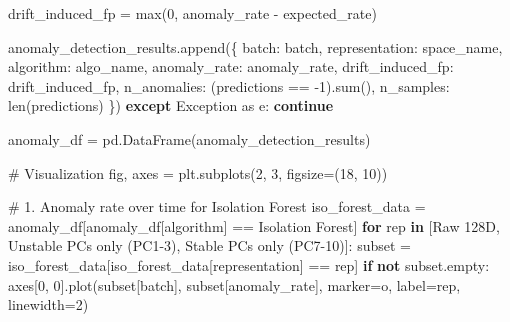 \documentclass[
  letterpaper,
  DIV=11,
  numbers=noendperiod]{scrartcl}
\newenvironment{Shaded}{\begin{snugshade}}{\end{snugshade}}
\newcommand{\BuiltInTok}[1]{\textcolor[rgb]{0.00,0.23,0.31}{#1}}
\newcommand{\CommentTok}[1]{\textcolor[rgb]{0.37,0.37,0.37}{#1}}
\newcommand{\ControlFlowTok}[1]{\textcolor[rgb]{0.00,0.23,0.31}{\textbf{#1}}}
\newcommand{\DecValTok}[1]{\textcolor[rgb]{0.68,0.00,0.00}{#1}}
\newcommand{\ImportTok}[1]{\textcolor[rgb]{0.00,0.46,0.62}{#1}}
\newcommand{\KeywordTok}[1]{\textcolor[rgb]{0.00,0.23,0.31}{\textbf{#1}}}
\newcommand{\NormalTok}[1]{\textcolor[rgb]{0.00,0.23,0.31}{#1}}
\newcommand{\OperatorTok}[1]{\textcolor[rgb]{0.37,0.37,0.37}{#1}}
\newcommand{\PreprocessorTok}[1]{\textcolor[rgb]{0.68,0.00,0.00}{#1}}
\newcommand{\StringTok}[1]{\textcolor[rgb]{0.13,0.47,0.30}{#1}}
\renewenvironment{Shaded}{%
  \begin{tcolorbox}[%
    enhanced,%
    colback=codebg,%
    colframe=codebg,%
    borderline west={3pt}{0pt}{sectionblue},%
    fontupper=\small\ttfamily,%
    boxrule=0pt,%
    arc=0pt,%
    boxsep=5pt,%
    left=2mm,%
    right=2mm,%
    top=2mm,%
    bottom=2mm%
  ]%
}{%
  \end{tcolorbox}%
}
\begin{document}
\begin{Shaded}
\begin{Highlighting}[]
\NormalTok{                drift\_induced\_fp }\OperatorTok{=} \BuiltInTok{max}\NormalTok{(}\DecValTok{0}\NormalTok{, anomaly\_rate }\OperatorTok{{-}}\NormalTok{ expected\_rate)}
                
\NormalTok{                anomaly\_detection\_results.append(\{}
                    \StringTok{\textquotesingle{}batch\textquotesingle{}}\NormalTok{: batch,}
                    \StringTok{\textquotesingle{}representation\textquotesingle{}}\NormalTok{: space\_name,}
                    \StringTok{\textquotesingle{}algorithm\textquotesingle{}}\NormalTok{: algo\_name,}
                    \StringTok{\textquotesingle{}anomaly\_rate\textquotesingle{}}\NormalTok{: anomaly\_rate,}
                    \StringTok{\textquotesingle{}drift\_induced\_fp\textquotesingle{}}\NormalTok{: drift\_induced\_fp,}
                    \StringTok{\textquotesingle{}n\_anomalies\textquotesingle{}}\NormalTok{: (predictions }\OperatorTok{==} \OperatorTok{{-}}\DecValTok{1}\NormalTok{).}\BuiltInTok{sum}\NormalTok{(),}
                    \StringTok{\textquotesingle{}n\_samples\textquotesingle{}}\NormalTok{: }\BuiltInTok{len}\NormalTok{(predictions)}
\NormalTok{                \})}
            \ControlFlowTok{except} \PreprocessorTok{Exception} \ImportTok{as}\NormalTok{ e:}
                \ControlFlowTok{continue}

\NormalTok{anomaly\_df }\OperatorTok{=}\NormalTok{ pd.DataFrame(anomaly\_detection\_results)}

\CommentTok{\# Visualization}
\NormalTok{fig, axes }\OperatorTok{=}\NormalTok{ plt.subplots(}\DecValTok{2}\NormalTok{, }\DecValTok{3}\NormalTok{, figsize}\OperatorTok{=}\NormalTok{(}\DecValTok{18}\NormalTok{, }\DecValTok{10}\NormalTok{))}

\CommentTok{\# 1. Anomaly rate over time for Isolation Forest}
\NormalTok{iso\_forest\_data }\OperatorTok{=}\NormalTok{ anomaly\_df[anomaly\_df[}\StringTok{\textquotesingle{}algorithm\textquotesingle{}}\NormalTok{] }\OperatorTok{==} \StringTok{\textquotesingle{}Isolation Forest\textquotesingle{}}\NormalTok{]}
\ControlFlowTok{for}\NormalTok{ rep }\KeywordTok{in}\NormalTok{ [}\StringTok{\textquotesingle{}Raw 128D\textquotesingle{}}\NormalTok{, }\StringTok{\textquotesingle{}Unstable PCs only (PC1{-}3)\textquotesingle{}}\NormalTok{, }\StringTok{\textquotesingle{}Stable PCs only (PC7{-}10)\textquotesingle{}}\NormalTok{]:}
\NormalTok{    subset }\OperatorTok{=}\NormalTok{ iso\_forest\_data[iso\_forest\_data[}\StringTok{\textquotesingle{}representation\textquotesingle{}}\NormalTok{] }\OperatorTok{==}\NormalTok{ rep]}
    \ControlFlowTok{if} \KeywordTok{not}\NormalTok{ subset.empty:}
\NormalTok{        axes[}\DecValTok{0}\NormalTok{, }\DecValTok{0}\NormalTok{].plot(subset[}\StringTok{\textquotesingle{}batch\textquotesingle{}}\NormalTok{], subset[}\StringTok{\textquotesingle{}anomaly\_rate\textquotesingle{}}\NormalTok{], }
\NormalTok{                       marker}\OperatorTok{=}\StringTok{\textquotesingle{}o\textquotesingle{}}\NormalTok{, label}\OperatorTok{=}\NormalTok{rep, linewidth}\OperatorTok{=}\DecValTok{2}\NormalTok{)}


\end{Highlighting}
\end{Shaded}
\end{document}
